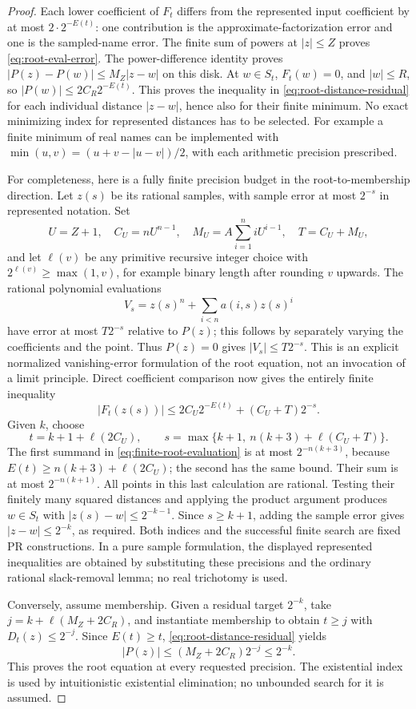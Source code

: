 \begin{proof}
Each lower coefficient of \(F_t\) differs from the represented input
coefficient by at most \(2\cdot2^{-E(t)}\): one contribution is the
approximate-factorization error and one is the sampled-name error.
The finite sum of powers at \(|z|\le Z\) proves
\eqref{eq:root-eval-error}. The power-difference identity proves
\(|P(z)-P(w)|\le M_Z|z-w|\) on this disk. At \(w\in S_t\),
\(F_t(w)=0\), and \(|w|\le R\), so
\(|P(w)|\le2C_R2^{-E(t)}\). This proves the inequality in
\eqref{eq:root-distance-residual} for each individual distance
\(|z-w|\), hence also for their finite minimum. No exact minimizing
index for represented distances has to be selected. For example a
finite minimum of real names can be implemented with
\(\min(u,v)=(u+v-|u-v|)/2\), with each arithmetic precision prescribed.

For completeness, here is a fully finite precision budget in the
root-to-membership direction. Let \(z(s)\) be its rational samples,
with sample error at most \(2^{-s}\) in represented notation. Set
\[
 U=Z+1,\quad C_U=nU^{n-1},\quad
 M_U=A\sum_{i=1}^n iU^{i-1},\quad T=C_U+M_U,
\]
and let \(\ell(v)\) be any primitive recursive integer choice with
\(2^{\ell(v)}\ge\max(1,v)\), for example binary length after rounding
\(v\) upwards. The rational polynomial evaluations
\[
 V_s=z(s)^n+\sum_{i<n}a(i,s)z(s)^i
\]
have error at most \(T2^{-s}\) relative to \(P(z)\); this follows by
separately varying the coefficients and the point. Thus \(P(z)=0\)
gives \(|V_s|\le T2^{-s}\). This is an explicit normalized
vanishing-error formulation of the root equation, not an invocation
of a limit principle. Direct coefficient comparison now gives the
entirely finite inequality
\[
 |F_t(z(s))|
 \le 2C_U2^{-E(t)}+(C_U+T)2^{-s}.
 \tag{FE}\label{eq:finite-root-evaluation}
\]
Given \(k\), choose
\[
 t=k+1+\ell(2C_U),\qquad
 s=\max\{k+1,\ n(k+3)+\ell(C_U+T)\}.
\]
The first summand in \eqref{eq:finite-root-evaluation} is at most
\(2^{-n(k+3)}\), because
\(E(t)\ge n(k+3)+\ell(2C_U)\); the second has the same bound.
Their sum is at most \(2^{-n(k+1)}\). All points in this last
calculation are rational. Testing their finitely many squared
distances and applying the product argument produces \(w\in S_t\)
with \(|z(s)-w|\le2^{-k-1}\). Since \(s\ge k+1\), adding the
sample error gives \(|z-w|\le2^{-k}\), as required. Both indices
and the successful finite search are fixed PR constructions. In a
pure sample formulation, the displayed represented inequalities are
obtained by substituting these precisions and the ordinary rational
slack-removal lemma; no real trichotomy is used.

Conversely, assume membership. Given a residual target \(2^{-k}\),
take \(j=k+\ell(M_Z+2C_R)\), and instantiate membership to obtain
\(t\ge j\) with \(D_t(z)\le2^{-j}\). Since \(E(t)\ge t\),
\eqref{eq:root-distance-residual} yields
\[
 |P(z)|\le(M_Z+2C_R)2^{-j}\le2^{-k}.
\]
This proves the root equation at every requested precision. The
existential index is used by intuitionistic existential elimination;
no unbounded search for it is assumed.
\end{proof}

